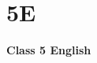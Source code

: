 \label{4 C5 English}
    \section{5E}
    \begin{frame}
    \begin{center}
    \begin{Huge}
        \textbf{Class 5 English}
    \end{Huge}
    \end{center}
    \end{frame}
 
    
